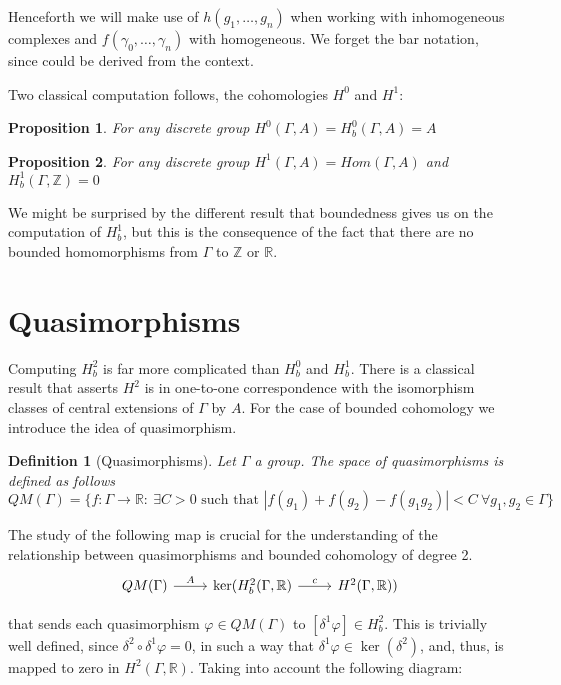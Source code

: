 \documentclass[leqno]{article}
\newtheorem*{proposition}{Proposition}
\newtheorem*{definition}{Definition}
\begin{document}
Henceforth we will make use of $h(g_1, \ldots, g_n)$ when working with inhomogeneous complexes and $f(\gamma_0, \ldots, \gamma_n)$ with homogeneous. We forget the bar notation, since could be derived from the context.

Two classical computation follows, the cohomologies $H^0$ and  $H^1$:

\begin{proposition}
For any discrete group $H^0(\Gamma , A) = H^0_{b} (\Gamma , A) = A$
\end{proposition}

\begin{proposition}
For any discrete group $H^1(\Gamma , A) = Hom(\Gamma , A)$  and  $H^1_{b} (\Gamma , \mathbb{Z}) = 0$
\end{proposition}

We might be surprised by the different result that boundedness gives us on the computation of $H^1_{b}$, but this is the consequence of the fact that there are no bounded homomorphisms from $\Gamma $ to $\mathbb{Z}$ or $\mathbb{R}$.

\section{Quasimorphisms}
Computing $H^2_b$ is far more complicated than  $H^0_b$ and  $H^1_b$. There is a classical result that asserts  $H^2$ is in one-to-one correspondence with the isomorphism classes of central extensions of $\Gamma $ by $A$. For the case of bounded cohomology we introduce the idea of quasimorphism.

 \begin{definition}[Quasimorphisms] Let $\Gamma $ a group. The space of quasimorphisms is defined as follows
   \[
	 QM(\Gamma ) = \{f:\Gamma \to \mathbb{R}: \ \exists C>0 \text{ such that } |f(g_1)+f(g_2)-f(g_1g_2)|<C \ \forall g_1, g_2\in \Gamma  \}   
   \] 
\end{definition}

The study of the following map is crucial for the understanding of the relationship between quasimorphisms and bounded cohomology of degree 2.
\[\begin{tikzcd}
	{QM(\Gamma)} & {\ker(H_b^2(\Gamma, \mathbb{R})} & {H^2(\Gamma, \mathbb{R}))} 
	\arrow["c", from=1-2, to=1-3]
	\arrow["A", from=1-1, to=1-2]
\end{tikzcd}\]

that sends each quasimorphism $\varphi \in QM(\Gamma )$ to $[\delta^1\varphi ]\in H_b^2$. This is trivially well defined, since $\delta^2\circ \delta^1 \varphi =0$, in such a way that $\delta^1 \varphi  \in \ker(\delta^2)$, and, thus, is mapped to zero in $H^2(\Gamma, \mathbb{R})$. Taking into account the following diagram:
\end{document}
